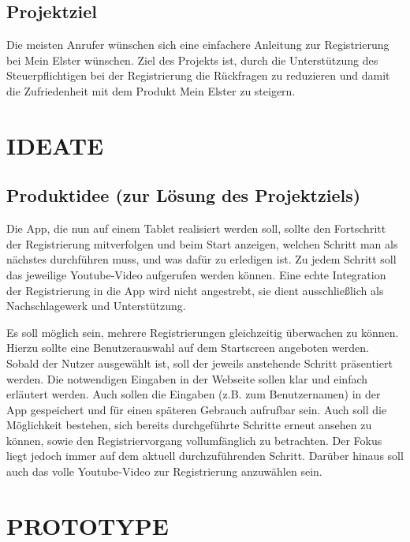 \subsection{Projektziel}\label{Projektziel}

Die meisten Anrufer wünschen sich eine einfachere Anleitung zur Registrierung bei \grq{}Mein Elster\grq{} wünschen. Ziel des Projekts ist, durch die Unterstützung des Steuerpflichtigen bei der Registrierung die Rückfragen zu reduzieren und damit die Zufriedenheit mit dem Produkt \grq{}Mein Elster\grq{} zu steigern.



\section{IDEATE}\label{IDEATE}


\subsection{Produktidee (zur Lösung des Projektziels)}\label{Produktidee (zur Lösung des Projektziels) }
Die App, die nun auf einem Tablet realisiert werden soll, sollte den Fortschritt der Registrierung mitverfolgen und beim Start anzeigen, welchen Schritt man als nächstes durchführen muss, und was dafür zu erledigen ist. Zu jedem Schritt soll das jeweilige Youtube-Video aufgerufen werden können. Eine echte Integration der Registrierung in die App wird nicht angestrebt, sie dient ausschließlich als Nachschlagewerk und Unterstützung.

Es soll möglich sein, mehrere Registrierungen gleichzeitig überwachen zu können. Hierzu sollte eine Benutzerauswahl auf dem Startscreen angeboten werden. Sobald der Nutzer ausgewählt ist, soll der jeweils anstehende Schritt präsentiert werden. Die notwendigen Eingaben in der Webseite sollen klar und einfach erläutert werden. Auch sollen die Eingaben (z.B. zum Benutzernamen) in der App gespeichert und für einen späteren Gebrauch aufrufbar sein.
Auch soll die Möglichkeit bestehen, sich bereits durchgeführte Schritte erneut ansehen zu können, sowie den Registriervorgang vollumfänglich zu betrachten. Der Fokus liegt jedoch immer auf dem aktuell durchzuführenden Schritt. Darüber hinaus soll auch das volle Youtube-Video zur Registrierung anzuwählen sein.


\section{PROTOTYPE}\label{PROTOTYPE}

